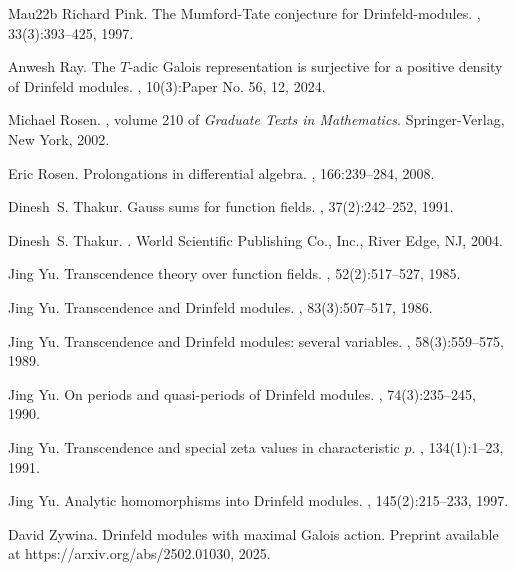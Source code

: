 \documentclass[10pt,a4paper]{amsart}
\theoremstyle{plain} %
\theoremstyle{definition}
\theoremstyle{remark}
\numberwithin{equation}{subsection}
\begin{document}
\begin{thebibliography}{Mau22b}
Richard Pink.
\newblock The {M}umford-{T}ate conjecture for {D}rinfeld-modules.
, 33(3):393--425, 1997.

Anwesh Ray.
\newblock The {$T$}-adic {G}alois representation is surjective for a positive
  density of {D}rinfeld modules.
, 10(3):Paper No. 56, 12, 2024.

Michael Rosen.
, volume 210 of {\em Graduate
  Texts in Mathematics}.
\newblock Springer-Verlag, New York, 2002.

Eric Rosen.
\newblock Prolongations in differential algebra.
, 166:239--284, 2008.

Dinesh~S. Thakur.
\newblock Gauss sums for function fields.
, 37(2):242--252, 1991.

Dinesh~S. Thakur.
.
\newblock World Scientific Publishing Co., Inc., River Edge, NJ, 2004.

Jing Yu.
\newblock Transcendence theory over function fields.
, 52(2):517--527, 1985.

Jing Yu.
\newblock Transcendence and {D}rinfel\cprime d{} modules.
, 83(3):507--517, 1986.

Jing Yu.
\newblock Transcendence and {D}rinfeld modules: several variables.
, 58(3):559--575, 1989.

Jing Yu.
\newblock On periods and quasi-periods of {D}rinfel\cprime d{} modules.
, 74(3):235--245, 1990.

Jing Yu.
\newblock Transcendence and special zeta values in characteristic {$p$}.
, 134(1):1--23, 1991.

Jing Yu.
\newblock Analytic homomorphisms into {D}rinfeld modules.
, 145(2):215--233, 1997.

David Zywina.
\newblock Drinfeld modules with maximal {G}alois action.
\newblock Preprint available at https://arxiv.org/abs/2502.01030, 2025.

\end{thebibliography}

	
	
\end{document}
